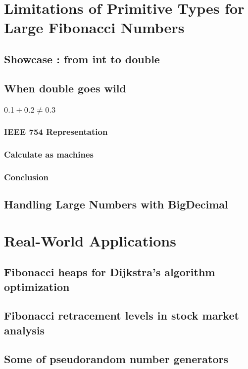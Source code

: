 \documentclass{article}
\begin{document}
\section{Limitations of Primitive Types for Large Fibonacci Numbers}
\subsection{Showcase : from int to double}
\subsection{When double goes wild}
\subsubsection{$0.1 + 0.2 \ne 0.3$}
\subsubsection{IEEE 754 Representation}
\subsubsection{Calculate as machines}
\subsubsection{Conclusion}
\subsection{Handling Large Numbers with BigDecimal}
\section{Real-World Applications}
\subsection{Fibonacci heaps for Dijkstra's algorithm optimization}
\subsection{Fibonacci retracement levels in stock market analysis}
\subsection{Some of pseudorandom number generators}

\end{document}
